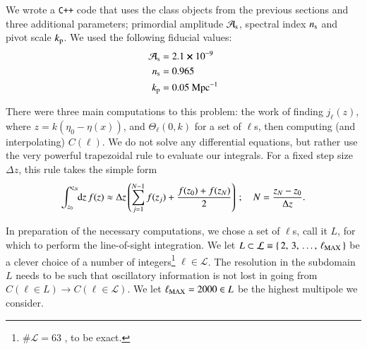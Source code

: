 




We wrote a \verb|C++| code that uses the class objects from the previous sections and three additional parameters; primordial amplitude $\mathcal{A}_\mathrm{s}$, spectral index $n_\mathrm{s}$ and pivot scale $k_\mathrm{p}$. We used the following fiducial values:
\begin{equation}
\begin{split}
    \mathcal{A}_\mathrm{s}  &=  2.1\cross 10^{-9}   \\
    n_\mathrm{s}            &=  0.965               \\
    k_\mathrm{p}            &=  0.05~\mathrm{Mpc^{-1}}
\end{split}
\end{equation}


There were three main computations to this problem: the work of finding $j_\ell(z)$, where $z= k(\eta_0-\eta(x))$, and $\Theta_\ell(0,k)$ for a set of $\ell$s, then computing (and interpolating) $C(\ell)$.
We do not solve any differential equations, but rather use the very powerful trapezoidal rule to evaluate our integrals. For a fixed step size $\Delta z$, this rule takes the simple form
\begin{equation}\label{mil4:imp:eq:trapezoidal_uniform}
    \int_{z_0}^{z_N} \!\!\mathop{}\!\mathrm{d} {z}\, f(z) \approx \Delta z \left( \sum_{j=1}^{N-1}f(z_j) + \frac{f(z_0) + f(z_{N})}{2} \right)\,; \quad N= \frac{z_N-z_0}{\Delta z}.
\end{equation}


In preparation of the necessary computations, we chose a set of $\ell$s, call it $L$, for which to perform the line-of-sight integration. We let $L\subset \mathcal{L}\equiv \{\,2,\,3,\, \dots,\,  \ell_\mathrm{MAX}\,\}$ be a clever choice of a number of integers\footnote{$\# \mathcal{L}=63$ , to be exact.} $\ell\in \mathcal{L}$. The resolution in the subdomain $L$ needs to be such that oscillatory information is not lost in going from $C(\ell\in L)\to C(\ell\in\mathcal{L})$. We let $\ell_\mathrm{MAX}=2000 \in L$ be the highest multipole we consider. 

